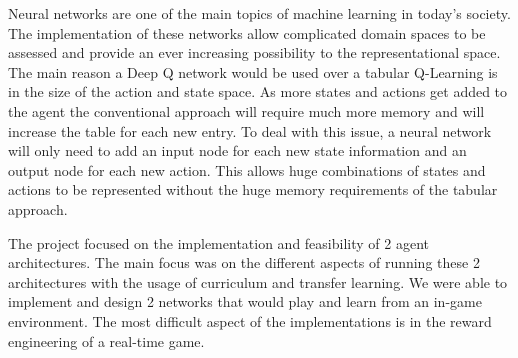 Neural networks are one of the main topics of machine learning in today's society. The implementation of these networks allow complicated domain spaces to be assessed and provide an ever increasing possibility to the representational space. The main reason a Deep Q network would be used over a tabular Q-Learning is in the size of the action and state space. As more states and actions get added to the agent the conventional approach will require much more memory and will increase the table for each new entry. To deal with this issue, a neural network will only need to add an input node for each new state information and an output node for each new action. This allows huge combinations of states and actions to be represented without the huge memory requirements of the tabular approach.

The project focused on the implementation and feasibility of 2 agent architectures. The main focus was on the different aspects of running these 2 architectures with the usage of curriculum and transfer learning. We were able to implement and design 2 networks that would play and learn from an in-game environment. The most difficult aspect of the implementations is in the reward engineering of a real-time game. 
